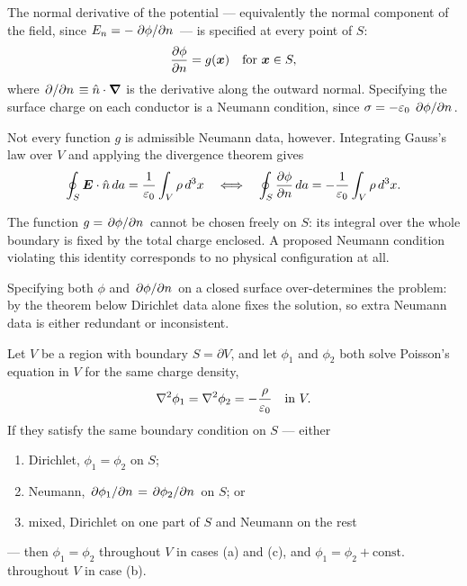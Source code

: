\begin{definition}
The normal derivative of the potential --- equivalently the normal component of the field, since $E_n = -\pdv*{\phi}{n}$ --- is specified at every point of $S$:
\[
    \pdv{\phi}{n}(\bm{x}) = g(\bm{x}) \quad\text{for } \bm{x}\in S,
\]
where $\pdv*{}{n} \equiv \hat{n}\cdot\grad$ is the derivative along the outward normal. Specifying the surface charge on each conductor is a Neumann condition, since $\sigma = -\varepsilon_0\,\pdv*{\phi}{n}$.
\end{definition}

Not every function $g$ is admissible Neumann data, however. Integrating Gauss's law over $V$ and applying the divergence theorem gives
\[
    \oint_S \vect{E}\cdot\hat{n}\,da = \frac{1}{\varepsilon_0}\int_V \rho\,d^3x
    \quad\Longleftrightarrow\quad
    \oint_S \pdv{\phi}{n}\,da = -\frac{1}{\varepsilon_0}\int_V \rho\,d^3x .
\]

\begin{fact}
The function $g = \pdv*{\phi}{n}$ cannot be chosen freely on $S$: its integral over the whole boundary is fixed by the total charge enclosed. A proposed Neumann condition violating this identity corresponds to no physical configuration at all.
\end{fact}

\begin{fact}
Specifying both $\phi$ and $\pdv*{\phi}{n}$ on a closed surface over-determines the problem: by the theorem below Dirichlet data alone fixes the solution, so extra Neumann data is either redundant or inconsistent.
\end{fact}

\begin{theorem}[Uniqueness]
\label{thm:em-uniqueness}
Let $V$ be a region with boundary $S = \partial V$, and let $\phi_1$ and $\phi_2$ both solve Poisson's equation in $V$ for the same charge density,
\[
    \laplacian\phi_1 = \laplacian\phi_2 = -\frac{\rho}{\varepsilon_0} \quad\text{in } V .
\]
If they satisfy the same boundary condition on $S$ --- either
\begin{enumerate}[label=(\alph*)]
    \item Dirichlet, $\phi_1 = \phi_2$ on $S$;
    \item Neumann, $\pdv*{\phi_1}{n} = \pdv*{\phi_2}{n}$ on $S$; or
    \item mixed, Dirichlet on one part of $S$ and Neumann on the rest
\end{enumerate}
--- then $\phi_1 = \phi_2$ throughout $V$ in cases (a) and (c), and $\phi_1 = \phi_2 + \text{const.}$ throughout $V$ in case (b).
\end{theorem}

